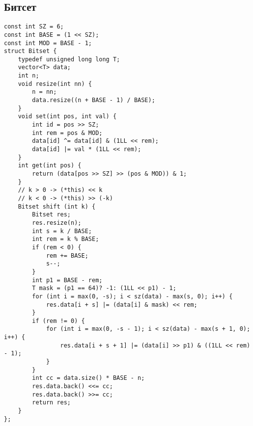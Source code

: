 \documentclass[14pt,fleqn]{article}
\begin{document}
\subsection{Битсет}
\begin{Verbatim}[tabsize=4]
const int SZ = 6;
const int BASE = (1 << SZ);
const int MOD = BASE - 1;
struct Bitset {
	typedef unsigned long long T;
	vector<T> data;
	int n;
	void resize(int nn) {
		n = nn;
		data.resize((n + BASE - 1) / BASE);
	}
	void set(int pos, int val) {
		int id = pos >> SZ;
		int rem = pos & MOD;
		data[id] ^= data[id] & (1LL << rem);
		data[id] |= val * (1LL << rem);
	}
	int get(int pos) {
		return (data[pos >> SZ] >> (pos & MOD)) & 1;
	}
	// k > 0 -> (*this) << k
	// k < 0 -> (*this) >> (-k)
	Bitset shift (int k) {
		Bitset res;
		res.resize(n);
		int s = k / BASE;
		int rem = k % BASE;
		if (rem < 0) {
			rem += BASE;
			s--;
		}
		int p1 = BASE - rem;
		T mask = (p1 == 64)? -1: (1LL << p1) - 1;
		for (int i = max(0, -s); i < sz(data) - max(s, 0); i++) {
			res.data[i + s] |= (data[i] & mask) << rem;
		}
		if (rem != 0) {
			for (int i = max(0, -s - 1); i < sz(data) - max(s + 1, 0); i++) {
				res.data[i + s + 1] |= (data[i] >> p1) & ((1LL << rem) - 1);
			}
		}
		int cc = data.size() * BASE - n;
		res.data.back() <<= cc;
		res.data.back() >>= cc;
		return res;
	}
};
\end{Verbatim}
\end{document}
